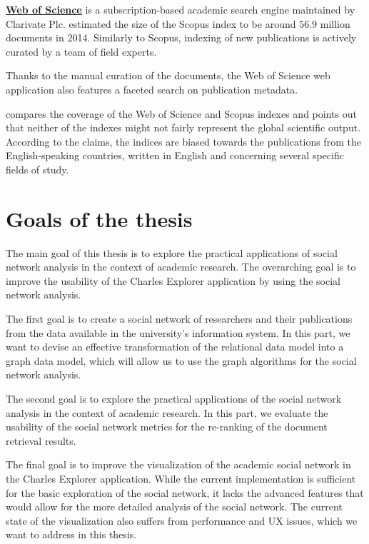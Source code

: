 \textbf{\href{https://www.webofscience.com/}{Web of Science}} is a subscription-based academic search engine maintained by Clarivate Plc.
\cite{google-scholar-size-estimation-2014} estimated the size of the Scopus index to be around $56.9$ million documents in 2014.
Similarly to Scopus, indexing of new publications is actively curated by a team of field experts.

Thanks to the manual curation of the documents, the Web of Science web application also features a faceted search on publication metadata.

\cite{wos-scopus-not-global} compares the coverage of the Web of Science and Scopus indexes and
points out that neither of the indexes might not fairly represent the global scientific output.
According to the claims, the indices are biased towards the publications from the English-speaking countries,
written in English and concerning several specific fields of study.

\section*{Goals of the thesis}\label{sec:goals}

The main goal of this thesis is to explore the practical applications of social network analysis 
in the context of academic research. The overarching goal is to improve the usability
of the Charles Explorer application by using the social network analysis.

The first goal is to create a social network of researchers and their publications from the data available in the university's information system.
In this part, we want to devise an effective transformation of the relational data model into a graph data model, 
which will allow us to use the graph algorithms for the social network analysis.

The second goal is to explore the practical applications of the social network analysis in the context of academic research.
In this part, we evaluate the usability of the social network metrics for the re-ranking of the document retrieval results.

The final goal is to improve the visualization of the academic social network in the Charles Explorer application.
While the current implementation is sufficient for the basic exploration of the social network, 
it lacks the advanced features that would allow for the more detailed analysis of the social network.
The current state of the visualization also suffers from performance and UX issues, which we want to address in this thesis.

